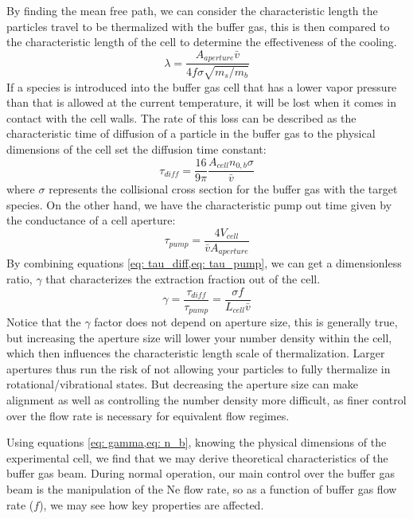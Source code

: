 By finding the mean free path, we can consider the characteristic length the particles travel to be thermalized with the buffer gas, this is then compared to the characteristic length of the cell to determine the effectiveness of the cooling.
\begin{equation*}
	\lambda = \frac{A_{aperture} \bar{v}}{4 f \sigma \sqrt{m_s/m_b}}
\end{equation*}
If a species is introduced into the buffer gas cell that has a lower vapor pressure than that is allowed at the current temperature, it will be lost when it comes in contact with the cell walls. The rate of this loss can be described as the  characteristic time of diffusion of a particle in the buffer gas to the physical dimensions of the cell set the diffusion time constant:
\begin{equation}
	\tau_{diff} = \frac{16}{9 \pi} \frac{A_{cell} n_{0,b} \sigma}{\bar{v}} \label{eq: tau_diff}
\end{equation}
where $\sigma$ represents the collisional cross section for the buffer gas with the target species. On the other hand, we have the characteristic pump out time given by the conductance of a cell aperture:
\begin{equation}
	\tau_{pump}=\frac{4V_{cell}}{\bar{v}A_{aperture}} \label{eq: tau_pump}
\end{equation}
By combining equations \cref{eq: tau_diff,eq: tau_pump}, we can get a dimensionless ratio, $\gamma$ that characterizes the extraction fraction out of the cell.
\begin{equation}
	\gamma = \frac{\tau_{diff}}{\tau_{pump}} = \frac{\sigma f}{L_{cell} \bar{v}} \label{eq: gamma}
\end{equation}
Notice that the $\gamma$ factor does not depend on aperture size, this is generally true, but increasing the aperture size will lower your number density within the cell, which then influences the characteristic length scale of thermalization. Larger apertures thus run the risk of not allowing your particles to fully thermalize in rotational/vibrational states. But decreasing the aperture size can make alignment as well as controlling the number density more difficult, as finer control over the flow rate is necessary for equivalent flow regimes.

Using equations \cref{eq: gamma,eq: n_b}, knowing the physical dimensions of the experimental cell, we find that we may derive theoretical characteristics of the buffer gas beam. During normal operation, our main control over the buffer gas beam is the manipulation of the Ne flow rate, so as a function of buffer gas flow rate ($f$), we may see how key properties are affected.

